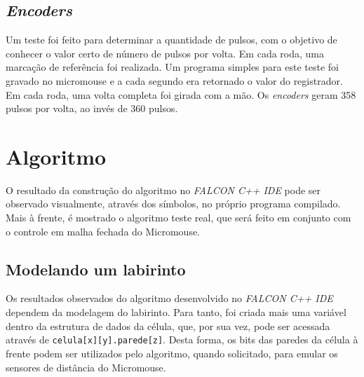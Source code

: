 %

\subsection{\textit{Encoders}}
	Um teste foi feito para determinar a quantidade de pulsos, com o objetivo de conhecer o valor certo de número de pulsos por volta. Em cada roda, uma marcação de referência foi realizada. Um programa simples para este teste foi gravado no micromouse e a cada segundo era retornado o valor do registrador. Em cada roda, uma volta completa foi girada com a mão. Os \textit{encoders} geram 358 pulsos por volta, ao invés de 360 pulsos.



\section{Algoritmo}

O resultado da construção do algoritmo no \textit{FALCON C++ IDE} pode ser observado visualmente, através dos símbolos, no próprio programa compilado. Mais à frente, é mostrado o algoritmo teste real, que será feito em conjunto com o controle em malha fechada do Micromouse.

\subsection{Modelando um labirinto}
Os resultados observados do algoritmo desenvolvido no \textit{FALCON C++ IDE} dependem da modelagem do labirinto. Para tanto, foi criada mais uma variável dentro da estrutura de dados da célula, que, por sua vez, pode ser acessada através de \verb+celula[x][y].parede[z]+. Desta forma, os bits das paredes da célula à frente podem ser utilizados pelo algoritmo, quando solicitado, para emular os sensores de distância do Micromouse.


